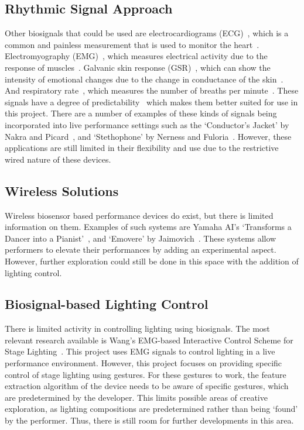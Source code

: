 \subsection{Rhythmic Signal Approach}
Other biosignals that could be used are electrocardiograms (ECG)~\cite{Afonso:1999}\cite{Pan:1985},
which is a common and painless measurement that is used to monitor the heart~\cite{Mayo:2023}.
Electromyography (EMG)~\cite{Tanaka:2002}\cite{Young:2013},
which measures electrical activity due to the response of muscles~\cite{Hopkins:2023}.
Galvanic skin response (GSR)~\cite{Kurniawan:2013},
which can show the intensity of emotional changes due to the change in conductance of the skin~\cite{Farnsworth:2018}.
And respiratory rate~\cite{Carlos:2011},
which measures the number of breaths per minute~\cite{Hopkins2:2023}.
These signals have a degree of predictability~\cite{Tahiroğlu:2008} which makes them better suited for use in this project.
There are a number of examples of these kinds of signals being incorporated into live performance settings such as
the `Conductor's Jacket' by Nakra and Picard~\cite{Nakra:1998}, and `Stethophone' by Nerness and Fuloria~\cite{Nerness:2019}.
However, these applications are still limited in their flexibility and use due to the restrictive wired nature of these devices.


\subsection{Wireless Solutions}
Wireless biosensor based performance devices do exist, but there is limited information on them.
Examples of such systems are Yamaha AI's `Transforms a Dancer into a Pianist'~\cite{Yamaha:2018}, and `Emovere' by Jaimovich~\cite{Jaimovich:2016}.
These systems allow performers to elevate their performances by adding an experimental aspect.
However, further exploration could still be done in this space with the addition of lighting control.

\subsection{Biosignal-based Lighting Control}
There is limited activity in controlling lighting using biosignals.
The most relevant research available is Wang's EMG-based Interactive Control Scheme for Stage Lighting~\cite{Wang:2022}.
This project uses EMG signals to control lighting in a live performance environment.
However, this project focuses on providing specific control of stage lighting using gestures.
For these gestures to work, the feature extraction algorithm of the device needs to be aware of specific gestures, which are predetermined by the developer.
This limits possible areas of creative exploration, as lighting compositions are predetermined rather than being `found' by the performer.
Thus, there is still room for further developments in this area.

